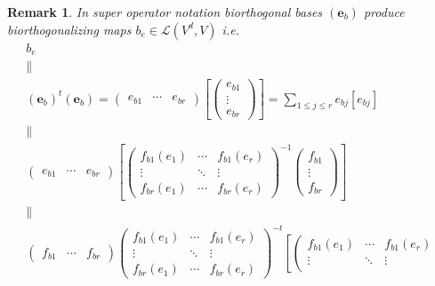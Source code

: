 \documentclass[aps,preprint]{revtex4}
\newtheorem{remark}[theorem]{Remark}
\begin{document}
\begin{remark}
In super operator notation biorthogonal bases $\left( \boldsymbol{e}%
_{b}\right) $ produce biorthogonalizing maps $b_{e}\in \mathcal{L}\left(
V^{d},V\right) $ i.e. 
\begin{gather}
b_{e} \\
\parallel \\
\left( \boldsymbol{e}_{b}\right) ^{t}\left( \boldsymbol{e}_{b}\right)
=\left( 
\begin{array}{ccc}
e_{b1} & \cdots & e_{br}%
\end{array}%
\right) \left[ \left( 
\begin{array}{c}
e_{b1} \\ 
\vdots \\ 
e_{br}%
\end{array}%
\right) \right] =\sum_{1\leq j\leq r}e_{bj}\left[ e_{bj}\right] \\
\parallel \\
\left( 
\begin{array}{ccc}
e_{b1} & \cdots & e_{br}%
\end{array}%
\right) \left[ \left( 
\begin{array}{ccc}
f_{b1}\left( e_{1}\right) & \cdots & f_{b1}\left( e_{r}\right) \\ 
\vdots & \ddots & \vdots \\ 
f_{br}\left( e_{1}\right) & \cdots & f_{br}\left( e_{r}\right)%
\end{array}%
\right) ^{-1}\left( 
\begin{array}{c}
f_{b1} \\ 
\vdots \\ 
f_{br}%
\end{array}%
\right) \right] \\
\parallel \\
\left( 
\begin{array}{ccc}
f_{b1} & \cdots & f_{br}%
\end{array}%
\right) \left( 
\begin{array}{ccc}
f_{b1}\left( e_{1}\right) & \cdots & f_{b1}\left( e_{r}\right) \\ 
\vdots & \ddots & \vdots \\ 
f_{br}\left( e_{1}\right) & \cdots & f_{br}\left( e_{r}\right)%
\end{array}%
\right) ^{-t}\left[ \left( 
\begin{array}{ccc}
f_{b1}\left( e_{1}\right) & \cdots & f_{b1}\left( e_{r}\right) \\ 
\vdots & \ddots & \vdots \\ 

\end{array}
\end{gather}
\end{remark}
\end{document}
